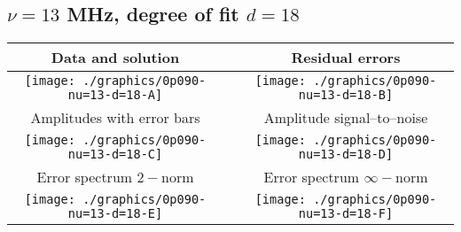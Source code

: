 

% 

\clearpage{}
\break{}

\subsection{$\nu = 13$ MHz, degree of fit $d = 18$}

\begin{table}[h]
    \begin{center}
        \begin{tabular}{ccc}
            Data and solution & \quad & Residual errors \\\hline
            \texttt{[image: ./graphics/0p090-nu=13-d=18-A]} &&
            \texttt{[image: ./graphics/0p090-nu=13-d=18-B]} \\[15pt]
            Amplitudes with error bars && Amplitude signal--to--noise \\\hline
            \texttt{[image: ./graphics/0p090-nu=13-d=18-C]} &&
            \texttt{[image: ./graphics/0p090-nu=13-d=18-D]} \\[15pt]
            Error spectrum $2-$norm && Error spectrum $\infty-$norm \\\hline
            \texttt{[image: ./graphics/0p090-nu=13-d=18-E]} &&
            \texttt{[image: ./graphics/0p090-nu=13-d=18-F]} \\[15pt]
        \end{tabular}
    \end{center}
\label{fig:elev=90, nu=13}
\end{table}



\endinput
